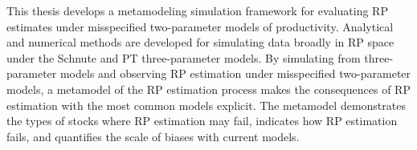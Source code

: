 \documentclass[12pt]{ucscthesis}
\begin{document}
%
This thesis develops a metamodeling simulation framework for evaluating RP 
estimates under misspecified two-parameter models of productivity. Analytical 
and numerical methods are developed for simulating data broadly in RP space 
under the Schnute and PT three-parameter models. 
By simulating from three-parameter models and observing RP estimation under misspecified two-parameter  
models, a metamodel of the RP estimation process makes the consequences of RP estimation with the most 
common models explicit. The metamodel demonstrates the types of stocks where RP estimation may fail, 
indicates how RP estimation fails, and quantifies the scale of biases with current models. 
\end{document}
